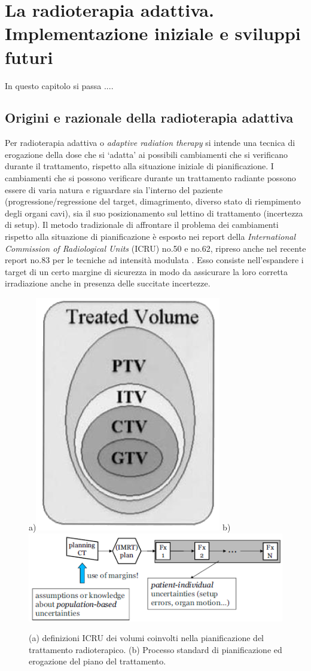 \chapter{La radioterapia adattiva. Implementazione iniziale e sviluppi futuri}
\minitoc
\textsf{In questo capitolo si passa ....}

\section{Origini e razionale della radioterapia adattiva}
Per radioterapia adattiva o \textit{adaptive radiation therapy} si intende una tecnica di erogazione della dose che si `adatta' ai possibili cambiamenti che si verificano durante il trattamento, rispetto alla situazione iniziale di pianificazione. I cambiamenti che si possono verificare durante un trattamento radiante possono essere di varia natura e riguardare sia l'interno del paziente (progressione/regressione del target, dimagrimento, diverso stato di riempimento degli organi cavi), sia il suo  posizionamento sul lettino di trattamento (incertezza di setup). Il metodo tradizionale di affrontare il problema dei cambiamenti rispetto alla situazione di pianificazione è esposto nei report della \textit{International Commission of Radiological Units} (ICRU) no.50 e no.62, ripreso anche nel recente report no.83 per le tecniche ad intensità modulata \cite{ICRU2010}. Esso consiste nell'espandere i target di un certo margine di sicurezza in modo da assicurare la loro corretta irradiazione anche in presenza delle succitate incertezze.
\begin{figure}
\centering
a)\includegraphics[width=.25\textwidth]{./cap3/ptv.png}
b) \includegraphics[width=.64\textwidth]{./cap3/adapt0.png}
\caption{(a) definizioni ICRU dei volumi coinvolti nella pianificazione del trattamento radioterapico. (b) Processo standard di pianificazione ed erogazione del piano del trattamento.}
\label{fig:adapt0}
\end{figure}

